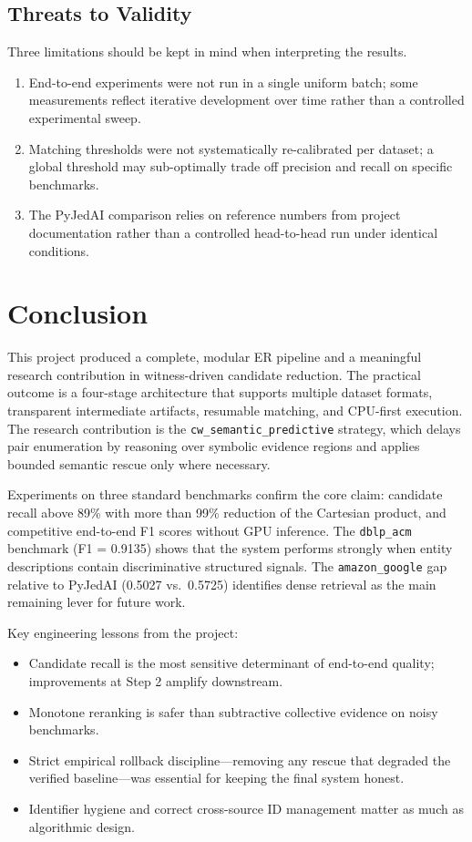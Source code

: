 \documentclass[10pt,twocolumn]{article}
\begin{document}
\subsection{Threats to Validity}

Three limitations should be kept in mind when interpreting the results.

\begin{enumerate}
  \item End-to-end experiments were not run in a single uniform batch; some
    measurements reflect iterative development over time rather than a
    controlled experimental sweep.
  \item Matching thresholds were not systematically re-calibrated per dataset;
    a global threshold may sub-optimally trade off precision and recall on
    specific benchmarks.
  \item The PyJedAI comparison relies on reference numbers from project
    documentation rather than a controlled head-to-head run under identical
    conditions.
\end{enumerate}

\section{Conclusion}

This project produced a complete, modular ER pipeline and a meaningful
research contribution in witness-driven candidate reduction. The practical
outcome is a four-stage architecture that supports multiple dataset formats,
transparent intermediate artifacts, resumable matching, and CPU-first
execution. The research contribution is the \texttt{cw\_semantic\_predictive}
strategy, which delays pair enumeration by reasoning over symbolic evidence
regions and applies bounded semantic rescue only where necessary.

Experiments on three standard benchmarks confirm the core claim: candidate
recall above 89\% with more than 99\% reduction of the Cartesian product,
and competitive end-to-end F1 scores without GPU inference. The
\texttt{dblp\_acm} benchmark (F1 = 0.9135) shows that the system performs
strongly when entity descriptions contain discriminative structured signals.
The \texttt{amazon\_google} gap relative to PyJedAI (0.5027 vs.\ 0.5725)
identifies dense retrieval as the main remaining lever for future work.

Key engineering lessons from the project:
\begin{itemize}
  \item Candidate recall is the most sensitive determinant of end-to-end
    quality; improvements at Step 2 amplify downstream.
  \item Monotone reranking is safer than subtractive collective evidence on
    noisy benchmarks.
  \item Strict empirical rollback discipline---removing any rescue that
    degraded the verified baseline---was essential for keeping the final
    system honest.
  \item Identifier hygiene and correct cross-source ID management matter as
    much as algorithmic design.
\end{itemize}
\end{document}
